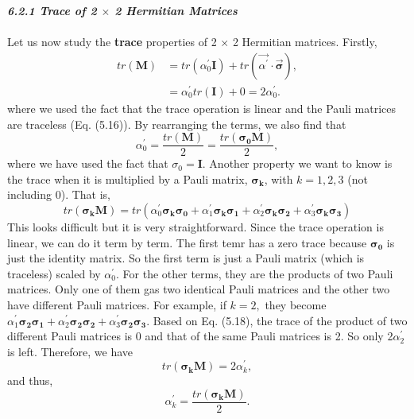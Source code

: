 \documentclass{article}
\newcommand{\bfit}[1]{\textit{\textbf{#1}}}
\begin{document}
\bfit{\large 6.2.1 Trace of 2 $\times$ 2 Hermitian Matrices}\\\\
Let us now study the \textbf{trace} properties of 2 $\times$ 2 Hermitian matrices. Firstly,
\begin{align*} \label{eq 6.7}
    tr(\boldsymbol{M})&=tr(\alpha_0^\prime\boldsymbol{I})+tr(\vec{\alpha^\prime}\cdot\vec{\boldsymbol{\sigma}}),\\
    &=\alpha_0^\prime tr(\boldsymbol{I})+0=2\alpha_0^\prime.\tag{6.7}
\end{align*}
where we used the fact that the trace operation is linear and the Pauli matrices
are traceless (Eq. (5.16)). By rearranging the terms, we also find that
\begin{equation} \label{eq 6.8}
    \alpha_0^\prime=\frac{tr(\boldsymbol{M})}{2}=\frac{tr(\boldsymbol{\sigma_0M})}{2},\tag{6.8}
\end{equation}
where we have used the fact that $\sigma_0=\boldsymbol{I}$. Another property we want to know is the
trace when it is multiplied by a Pauli matrix, $\boldsymbol{\sigma_k}$, with $k=1, 2, 3$ (not including 0).
That is,
\begin{equation}\label{eq 6.9}
    tr(\boldsymbol{\sigma_kM})=tr(\alpha_0^\prime\boldsymbol{\sigma_k\sigma_0}+\alpha_1^\prime\boldsymbol{\sigma_k\sigma_1}
    +\alpha_2^\prime\boldsymbol{\sigma_k\sigma_2}+\alpha_3^\prime\boldsymbol{\sigma_k\sigma_3})\tag{6.9}
\end{equation}
This looks difficult but it is very straightforward. Since the trace operation is linear,
we can do it term by term. The first temr has a zero trace because $\boldsymbol{\sigma_0}$ 
is just the identity matrix. So the first term is just a Pauli matrix (which is traceless)
scaled by $\alpha_0^\prime$. For the other terms, they are the products of two Pauli matrices. 
Only one of them gas two identical Pauli matrices and the other two have different Pauli matrices.
For example, if $k=2,$ they become $\alpha_1^\prime\boldsymbol{\sigma_2\sigma_1}+\alpha_2^\prime\boldsymbol{\sigma_2\sigma_2}+\alpha_3^\prime\boldsymbol{\sigma_2\sigma_3}$.
Based on Eq. (5.18), the trace of the product of two different Pauli matrices is 0 and that of the same Pauli
matrices is 2. So only 2$\alpha_2^\prime$ is left. Therefore, we have
\begin{equation}\label{eq 6.10}
    tr(\boldsymbol{\sigma_kM})=2\alpha_k^\prime,\tag{6.10}
\end{equation}
and thus,
\begin{equation}\label{eq 6.11}
    \alpha_k^\prime=\frac{tr(\boldsymbol{\sigma_kM})}{2}.\tag{6.11}
\end{equation}
\end{document}
